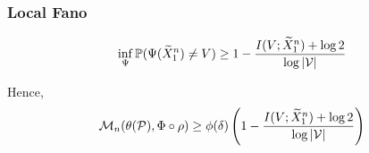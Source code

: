 \documentclass[10pt,xcolor={usenames,dvipsnames,table},aspectratio=169]{beamer}
\begin{document}
\begin{frame}
    \frametitle{Local Fano}
    \begin{lemma}
        \[
        \inf_{\Psi} \mathbb{P}(\Psi(\widetilde{X}_1^{n}) \neq V) \geq 1-\dfrac{I(V; \widetilde{X}_1^{n}) + \log 2}{\log \left\lvert\mathcal{V}\right\rvert}
        \] 
    \end{lemma}
    Hence,
    \[
    \mathcal{M}_n(\theta(\mathcal{P}), \Phi \circ \rho) \geq \phi(\delta)  \left( 1 - \dfrac{I(V; \widetilde{X}_1^{n}) + \log 2}{\log \left\lvert\mathcal{V}\right\rvert} \right)
    \] 
\end{frame}
\end{document}

